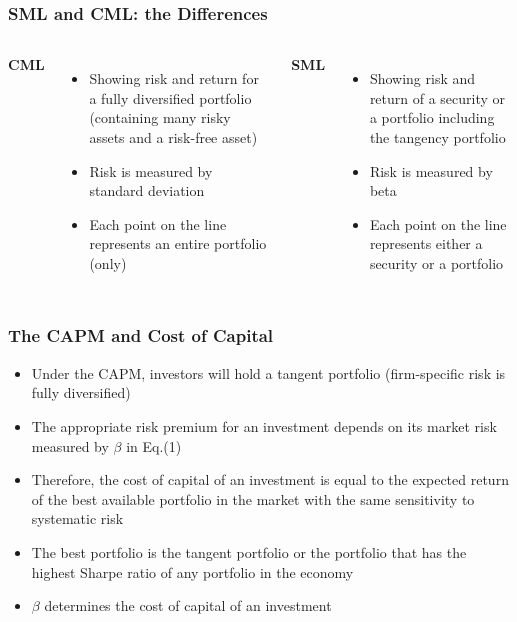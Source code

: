 \documentclass[9pt,aspectratio=169]{beamer}
\begin{document}
\begin{frame}

\frametitle{\textnormal{SML and CML: the Differences}}
\begin{columns}
\textbf{CML}
\begin{itemize}
    \item Showing risk and return for a fully diversified portfolio (containing many risky assets and a risk-free asset)
\item Risk is measured by standard deviation
\item Each point on the line represents an entire portfolio (only)

\end{itemize}
\textbf{SML}
\begin{itemize}
    \item Showing risk and return of a security or a portfolio including the tangency portfolio
\item Risk is measured by beta
\item Each point on the line  represents either a security or a portfolio 

\end{itemize}
\end{columns}

\end{frame}



\begin{frame}

\frametitle{\textnormal{The CAPM and Cost of Capital}}

\begin{itemize}
    \item Under the CAPM, investors will hold a tangent portfolio (firm-specific risk is fully diversified)
 \item The appropriate risk premium for an investment  depends on its market risk measured by $\beta$ in Eq.(1)
 \item Therefore, the cost of capital of an investment is equal to the expected return of the best available portfolio in the market with the same sensitivity to systematic risk
 \item The best portfolio is the tangent portfolio or the portfolio that has the highest Sharpe ratio of any portfolio in the economy
 \item $\beta$ determines the cost of capital of an investment



\end{itemize}

\end{frame}
\end{document}
